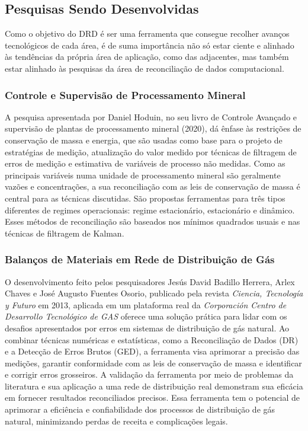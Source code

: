 \subsection{Pesquisas Sendo Desenvolvidas}

Como o objetivo do DRD é ser uma ferramenta que consegue recolher avanços tecnológicos de cada área, é de suma importância não só estar ciente e alinhado às tendências da própria área de aplicação, como das adjacentes, mas também estar alinhado às pesquisas da área de reconciliação de dados computacional. 

\subsubsection{Controle e Supervisão de Processamento Mineral}

A pesquisa apresentada por Daniel Hoduin, no seu livro de Controle Avançado e supervisão de plantas de processamento mineral (2020), dá  ênfase às restrições de conservação de massa e energia, que são usadas como base para o projeto de estratégias de medição, atualização do valor medido por técnicas de filtragem de erros de medição e estimativa de variáveis de processo não medidas. Como as principais variáveis numa unidade de processamento mineral são geralmente vazões e concentrações, a sua reconciliação com as leis de conservação de massa é central para as técnicas discutidas. São propostas ferramentas para três tipos diferentes de regimes operacionais: regime estacionário, estacionário e dinâmico. Esses métodos de reconciliação são baseados nos mínimos quadrados usuais e nas técnicas de filtragem de Kalman.

\subsubsection{Balanços de Materiais em Rede de Distribuição de Gás}

O desenvolvimento feito pelos pesquisadores Jesús David Badillo Herrera, Arlex Chaves e José Augusto Fuentes Osorio, publicado pela revista \textit{Ciencia, Tecnología y Futuro} em 2013, aplicada em um plataforma real da \textit{Corporación Centro de Desarrollo Tecnológico de GAS} oferece uma solução prática para lidar com os desafios apresentados por erros em sistemas de distribuição de gás natural. Ao combinar técnicas numéricas e estatísticas, como a Reconciliação de Dados (DR) e a Detecção de Erros Brutos (GED), a ferramenta visa aprimorar a precisão das medições, garantir conformidade com as leis de conservação de massa e identificar e corrigir erros grosseiros. A validação da ferramenta por meio de problemas da literatura e sua aplicação a uma rede de distribuição real demonstram sua eficácia em fornecer resultados reconciliados precisos. Essa ferramenta tem o potencial de aprimorar a eficiência e confiabilidade dos processos de distribuição de gás natural, minimizando perdas de receita e complicações legais.

